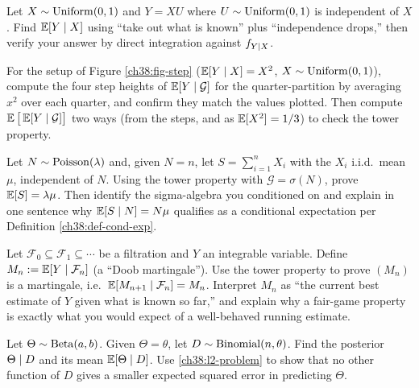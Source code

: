 \begin{exercise}
\label{ch38:ex-takeout}
Let $X \sim \operatorname{Uniform}(0,1)$ and $Y = X U$ where $U \sim \operatorname{Uniform}(0,1)$ is independent of $X$. Find
$\operatorname{\mathbb{E}}[Y\mid X]$ using ``take out what is known'' plus ``independence drops,'' then verify your answer
by direct integration against $f_{Y\mid X}$.
\end{exercise}

\begin{exercise}
\label{ch38:ex-coarser}
For the setup of Figure \ref{ch38:fig-step} ($\operatorname{\mathbb{E}}[Y\mid X] = X^2$, $X \sim \operatorname{Uniform}(0,1)$), compute the
four step heights of $\operatorname{\mathbb{E}}[Y\mid\mathcal{G}]$ for the quarter-partition by averaging $x^2$ over each
quarter, and confirm they match the values plotted. Then compute $\operatorname{\mathbb{E}}\big[\operatorname{\mathbb{E}}[Y\mid\mathcal{G}]\big]$
two ways (from the steps, and as $\operatorname{\mathbb{E}}[X^2] = 1/3$) to check the tower property.
\end{exercise}

\begin{exercise}
\label{ch38:ex-tower}
Let $N \sim \operatorname{Poisson}(\lambda)$ and, given $N = n$, let $S = \sum_{i=1}^n X_i$ with the $X_i$ i.i.d.\
mean $\mu$, independent of $N$. Using the tower property with $\mathcal{G} = \sigma(N)$, prove
$\operatorname{\mathbb{E}}[S] = \lambda\mu$. Then identify the sigma-algebra you conditioned on and explain in one sentence
why $\operatorname{\mathbb{E}}[S\mid N] = N\mu$ qualifies as a conditional expectation per Definition
\ref{ch38:def-cond-exp}.
\end{exercise}

\begin{exercise}
\label{ch38:ex-martingale}
Let $\mathcal{F}_0 \subseteq \mathcal{F}_1 \subseteq \cdots$ be a filtration and $Y$ an integrable
variable. Define $M_n := \operatorname{\mathbb{E}}[Y\mid\mathcal{F}_n]$ (a ``Doob martingale''). Use the tower property to
prove $(M_n)$ is a martingale, i.e.\ $\operatorname{\mathbb{E}}[M_{n+1}\mid\mathcal{F}_n] = M_n$. Interpret $M_n$ as ``the
current best estimate of $Y$ given what is known so far,'' and explain why a fair-game property is
exactly what you would expect of a well-behaved running estimate.
\end{exercise}

\begin{exercise}
\label{ch38:ex-bayes}
Let $\Theta \sim \operatorname{Beta}(a,b)$. Given $\Theta = \theta$, let $D \sim \operatorname{Binomial}(n,\theta)$. Find the posterior
$\Theta \mid D$ and its mean $\operatorname{\mathbb{E}}[\Theta\mid D]$. Use \eqref{ch38:l2-problem} to show that no
other function of $D$ gives a smaller expected squared error in predicting $\Theta$.
\end{exercise}

